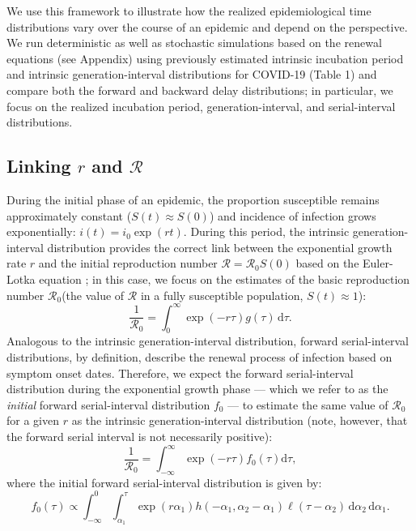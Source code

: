 \documentclass[12pt]{article}
\newcommand{\Rx}[1]{\ensuremath{{\mathcal R}_{#1}}\xspace}
\newcommand{\Ro}{\Rx{0}}
\newcommand{\RR}{\ensuremath{{\mathcal R}}\xspace}
\newcommand{\dd}[1]{\ensuremath{\, \mathrm{d}#1}}
\newcommand{\dtau}{\dd{\tau}}
\newcommand{\pinf}{\ensuremath{\alpha_1}} %
\newcommand{\sinf}{\ensuremath{\alpha_2}} %
\newcommand{\idist}{\ell} %
\begin{document}
We use this framework to illustrate how the realized epidemiological time distributions vary over the course of an epidemic and depend on the perspective.
We run deterministic as well as stochastic simulations based on the renewal equations (see Appendix) using previously estimated intrinsic incubation period and intrinsic generation-interval distributions for COVID-19 (Table 1) and compare both the forward and backward delay distributions;
in particular, we focus on the realized incubation period, generation-interval, and serial-interval distributions.

\subsection{Linking $r$ and \RR}

During the initial phase of an epidemic, the proportion susceptible remains approximately constant ($S(t) \approx S(0)$) and incidence of infection grows exponentially: $i(t)=i_0\exp(rt)$.
During this period, the intrinsic generation-interval distribution provides the correct link between the exponential growth rate $r$ and the initial reproduction number $\RR=\Ro S(0)$ based on the Euler-Lotka equation \citep{wallinga2007generation};
in this case, we focus on the estimates of the basic reproduction number \Ro (the value of \RR in a fully susceptible population, $S(t) \approx 1$):
\begin{equation}
\frac{1}{\Ro} = \int_0^\infty \exp(-r\tau) g(\tau) \dtau.
\end{equation}
Analogous to the intrinsic generation-interval distribution, 
forward serial-interval distributions, by definition, describe the renewal process of infection based on symptom onset dates.
Therefore, we expect the forward serial-interval distribution during the exponential growth phase --- which we refer to as the \emph{initial} forward serial-interval distribution $f_0$ --- to estimate the same value of \Ro for a given $r$ as the intrinsic generation-interval distribution (note, however, that the forward serial interval is not necessarily positive):
\begin{equation}
\frac{1}{\Ro} = \int_{-\infty}^\infty \exp(-r\tau) f_{0}(\tau) \mathrm{d} \tau,
\end{equation}
where the initial forward serial-interval distribution is given by:
\begin{equation}
f_{0}(\tau) \propto \int_{-\infty}^{0} \int_{\pinf}^{\tau} \exp(r \pinf) h(-\pinf, \sinf - \pinf) \idist(\tau - \sinf) \, \mathrm{d}\sinf\,\mathrm{d}\pinf.
\end{equation}
\end{document}

